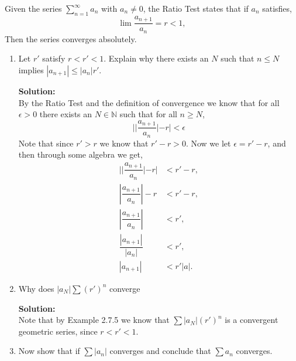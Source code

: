\documentclass[12pt]{article}
\makeatletter
\theoremstyle{homework}
\newenvironment{exercise}[1]
{\def\@currentlabel{#1}\exercisecore}
{\endexercisecore}
\newcommand{\localhead}[1]{\par\smallskip\noindent\textbf{#1}\nobreak\\}%
\newcommand\solution{\localhead{Solution:}}
\newcommand{\Nats}{\ensuremath{\mathbb N}}
\makeatother
\begin{document}
\begin{exercise}{Exercise 2.7.9} Given the series $\sum_{n = 1}^{\infty} a_n$
  with $a_n \neq 0$, the Ratio Test states that if $a_n$ satisfies,
  \begin{equation*}
    \lim{\dfrac{a_{n+1}}{a_n}} = r < 1,
  \end{equation*}
  Then the series converges absolutely.\\


\begin{enumerate}
  \item Let $r'$ satisfy $r < r' < 1$. Explain why there exists an $N$ such that 
  $n \le N$ implies $|a_{n+1}|\le |a_n|r'$.\\

  \solution By the Ratio Test and the definition of convergence we know that for all 
  $\epsilon > 0$ there exists an $N \in \Nats$ such that for all $n \geq N$,
  \begin{equation*}
    ||\dfrac{a_{n+1}}{a_n}| - r| < \epsilon 
  \end{equation*}
  Note that since $r' > r$ we know that $r' - r > 0$. Now we let $\epsilon  = r' - r$, and then through some algebra we get,
  \begin{align*}
    ||\dfrac{a_{n+1}}{a_n}| - r| &< r' - r,\\
    |\dfrac{a_{n+1}}{a_n}| - r &< r' - r,\\
    |\dfrac{a_{n+1}}{a_n}| &< r', \\
    \dfrac{|a_{n+1}|}{|a_n|} &< r', \\
    |a_{n+1}| &< r'|a|.
  \end{align*}
  \vspace{.25in}


  \item Why does $|a_N| \sum (r')^n$ converge\\
  
  \solution Note that by Example 2.7.5 we know that $\sum |a_N| (r')^n$ is a convergent geometric series, since $r < r' <1$.

  \vspace{.25in}


  \item Now show that if $\sum|a_n|$ converges and conclude that $\sum a_n$ converges.\\
  

\end{enumerate}
\end{exercise}
\end{document}
